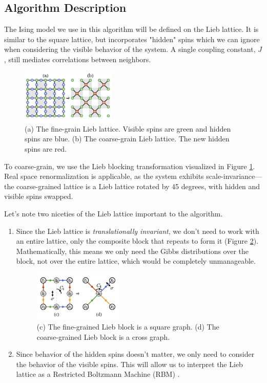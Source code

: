 \documentclass[%
    reprint,
    amsmath,amssymb,
    aps,
]{revtex4-2}
\begin{document}
\subsection{Algorithm Description}

The Ising model we use in this algorithm will be defined on the Lieb lattice. 
It is similar to the square lattice, but incorporates "hidden" spins which we can ignore when considering the visible behavior of the system. 
A single coupling constant, $J$, still mediates correlations between neighbors. 

\begin{figure}[h]
    \includegraphics[width=0.4\textwidth]{tex/images/lieb-blocking.png}
    \caption{\label{fig:lieb}
        (a) The fine-grain Lieb lattice. Visible spins are green and hidden spins are blue. 
        (b) The coarse-grain Lieb lattice. The new hidden spins are red. 
    }
\end{figure}

To coarse-grain, we use the Lieb blocking transformation visualized in Figure \ref{fig:lieb}. 
Real space renormalization is applicable, as the system exhibits scale-invariance—the coarse-grained lattice is a Lieb lattice rotated by 45 degrees, with hidden and visible spins swapped. 

Let's note two niceties of the Lieb lattice important to the algorithm. 
\begin{enumerate}
    \item{
        Since the Lieb lattice is \textit{translationally invariant}, we don't need to work with an entire lattice, only the composite block that repeats to form it (Figure \ref{fig:lieb-blocks}). 
        Mathematically, this means we only need the Gibbs distributions over the block, not over the entire lattice, which would be completely unmanageable. 

        \begin{figure}[h]
            \includegraphics[width=0.4\textwidth]{tex/images/lieb-blocks.png}
            \caption{\label{fig:lieb-blocks}
                (c) The fine-grained Lieb block is a square graph. 
                (d) The coarse-grained Lieb block is a cross graph. 
            }
        \end{figure}
    }
    \item{
        Since behavior of the hidden spins doesn't matter, we only need to consider the behavior of the visible spins. 
        This will allow us to interpret the Lieb lattice as a Restricted Boltzmann Machine (RBM) \cite{hinton-rbm}. 
    }
\end{enumerate}
\end{document}
